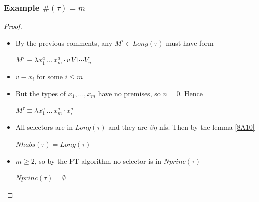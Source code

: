 \begin{frame}
 \frametitle{Example $\#(\tau) = m$}

\begin{proof}
 \begin{itemize}
  \item By the previous comments, any $M^{\tau} \in Long(\tau)$ must have form\\[0.3 cm]
\begin{center}
 $M^\tau \equiv \lambda x_1^a\,...\, x_m^a \cdot v\,V1 \cdots V_n$
\end{center}
  \item $v \equiv x_i$ for some $i\leq m$
  \item But the types of $x_1, ..., x_m$ have no premises, so $n = 0$. Hence\\[0.3 cm]
\begin{center}
 $M^{\tau} \equiv \lambda x_1^a\,...\,x_m^a \cdot x_i^a$
\end{center}
  \item All selectors are in $Long(\tau)$ and they are $\beta\eta$-nfs. Then by the lemma \ref{8A10}\\[0.3 cm]
\begin{center}
 $Nhabs(\tau) = Long(\tau)$
\end{center}
  \item $m \geq 2$, so by the PT algorithm no selector is in $Nprinc(\tau)$\\[0.3 cm]
\begin{center}
 $Nprinc(\tau) = \emptyset$ 
\end{center}


\end{itemize}
\end{proof}

 
\end{frame}


